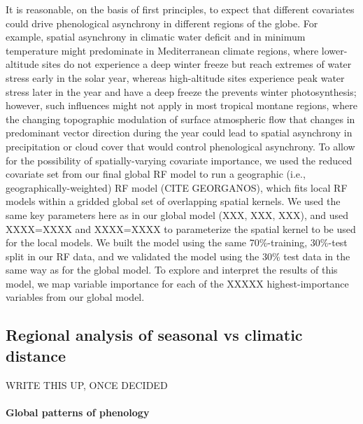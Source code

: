 \documentclass[12pt]{article}
\begin{document}
It is reasonable, on the basis of first principles, to expect that different
covariates could drive phenological asynchrony in different regions of the globe.
For example, spatial asynchrony in climatic water deficit and in minimum temperature
might predominate in Mediterranean climate regions, where lower-altitude sites
do not experience a deep winter freeze but reach extremes of water stress early
in the solar year, whereas high-altitude sites experience peak
water stress later in the year and have a deep freeze the prevents winter
photosynthesis; however, such influences might not apply in most tropical montane regions,
where the changing topographic modulation of surface atmospheric flow that changes
in predominant vector direction during the year could lead to spatial
asynchrony in precipitation or cloud cover that would control phenological asynchrony.
To allow for the possibility of spatially-varying covariate importance,
we used the reduced covariate set from our final global RF model to run a
geographic (i.e., geographically-weighted) RF model (CITE GEORGANOS), which
fits local RF models within a gridded global set of overlapping spatial kernels.
We used the same key parameters here as in our global model (XXX, XXX, XXX),
and used XXXX=XXXX and XXXX=XXXX to parameterize the spatial kernel to be used
for the local models. We built the model using the same 70\%-training, 30\%-test split
in our RF data, and we validated the model using the 30\% test data in the same way
as for the global model. To explore and interpret the results of this model,
we map variable importance for each of the XXXXX highest-importance variables
from our global model.


\subsection*{Regional analysis of seasonal vs climatic distance}
WRITE THIS UP, ONCE DECIDED


\paragraph*{Global patterns of phenology}











\end{document}
